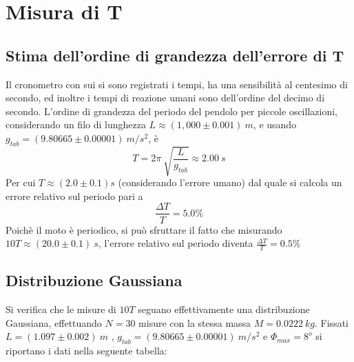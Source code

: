 \documentclass[12pt, a4paper]{article}
\begin{document}
\section{Misura di T}
\subsection{Stima dell'ordine di grandezza dell'errore di T}
Il cronometro con sui si sono registrati i tempi, ha una sensibilità al centesimo di secondo, ed inoltre i tempi di reazione umani sono dell'ordine del decimo di secondo. L'ordine di grandezza del periodo del pendolo per piccole oscillazioni, considerando un filo di lunghezza $L\approx (1,000\pm 0.001)\ m$, e usando $g_{tab}=(9.80665\pm0.00001) \ m/s^2$, è
\begin{equation*}
    T= 2\pi\ \sqrt{\frac{L}{g_{tab}}}\approx 2.00\ s
\end{equation*}
Per cui $T\approx(2.0\pm 0.1)s$ (considerando l'errore umano) dal quale si calcola un errore relativo sul periodo pari a
 \begin{equation*}
     \frac{\Delta T}{T}=5.0\%
 \end{equation*}
Poichè il moto è periodico, si può sfruttare il fatto che misurando $10T\approx(20.0\pm 0.1)\ s$, l'errore relativo sul periodo diventa $\displaystyle \frac{\Delta T}{T} = 0.5\% $
\newpage



\subsection{Distribuzione Gaussiana}
\label{gaussiana}
Si verifica che le misure di $10T$ seguano effettivamente una distribuzione Gaussiana, effettuando $N=30$ misure con la stessa massa $M=0.0222 \ kg$.
Fissati $L=(1.097\pm 0.002)\ m$ , $g_{tab}=(9.80665\pm 0.00001)\ m/s^2$ e $\Phi_{max}=8^o$ si riportano i dati nella seguente tabella: 
\end{document}

